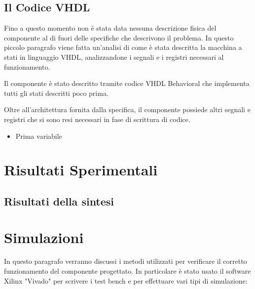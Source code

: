 \documentclass{article}
\begin{document}
\subsection{Il Codice VHDL}

Fino a questo momento non è stata data nessuna descrizione fisica del componente al di fuori delle specifiche che descrivono il problema. In questo piccolo paragrafo viene fatta un'analisi di come è stata descritta la macchina a stati in linguaggio VHDL, analizzandone i segnali e i registri necessari al funzionamento.

Il componente è stato descritto tramite codice VHDL Behavioral che implementa tutti gli stati descritti poco prima. %

 Oltre all'architettura fornita dalla specifica, il componente possiede altri segnali e registri che si sono resi necessari in fase di scrittura di codice.



\begin{itemize}

\item Prima variabile
\end{itemize}

\section{Risultati Sperimentali}

\subsection{Risultati della sintesi}





\section{Simulazioni}

In questo paragrafo verranno discussi i metodi utilizzati per verificare il corretto funzionamento del componente progettato. In particolare è stato usato il software Xilinx "Vivado" per scrivere i test bench e per effettuare vari tipi di simulazione: 
\end{document}
